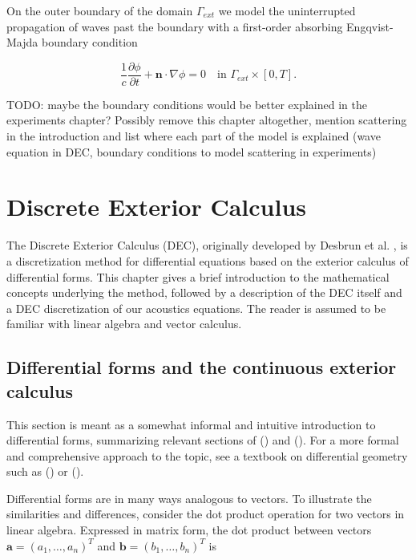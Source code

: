 \documentclass[utf8,english]{gradu3}
\begin{document}
On the outer boundary of the domain $\Gamma_{ext}$
we model the uninterrupted propagation of waves past the boundary
with a first-order absorbing Engqvist-Majda boundary condition
\parencite{engquist_absorbing_1977}

\[
  \frac{1}{c}\frac{\partial\phi}{\partial t} + \mathbf{n} \cdot \nabla\phi = 0
  \quad \text{in } \Gamma_{ext} \times [0, T].
\]


TODO: maybe the boundary conditions would be better explained
in the experiments chapter?
Possibly remove this chapter altogether,
mention scattering in the introduction
and list where each part of the model is explained
(wave equation in DEC, boundary conditions to model scattering in experiments)



\chapter{Discrete Exterior Calculus}

The Discrete Exterior Calculus (DEC),
originally developed by Desbrun et al. \parencite*{desbrun_discrete_2005},
is a discretization method for differential equations
based on the exterior calculus of differential forms.
This chapter gives a brief introduction to the mathematical concepts
underlying the method, followed by a description of the DEC itself
and a DEC discretization of our acoustics equations.
The reader is assumed to be familiar with linear algebra and vector calculus.

\section{Differential forms and the continuous exterior calculus}

This section is meant as a somewhat informal and intuitive introduction
to differential forms, summarizing relevant sections of
(\cite{blair_perot_differential_2014}) and (\cite{crane_digital_2013}).
For a more formal and comprehensive approach to the topic,
see a textbook on differential geometry such as (\cite{lee_introduction_2012})
or (\cite{abraham_manifolds_2012}).

Differential forms are in many ways analogous to vectors.
To illustrate the similarities and differences,
consider the dot product operation
for two vectors in linear algebra.
Expressed in matrix form, the dot product between vectors
$\mathbf{a} = (a_1, \dots, a_n)^T$ and $\mathbf{b} = (b_1, \dots, b_n)^T$
is
\end{document}
